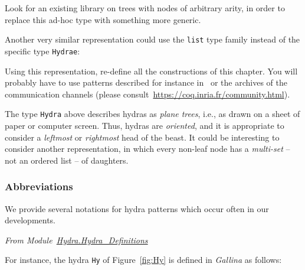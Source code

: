 



\begin{project}
Look for an existing library on trees with nodes of arbitrary arity, in order to replace  this ad-hoc type with something more generic.
\end{project}



\begin{project}

 Another very similar representation could use the \texttt{list} type family instead of the specific 
type \texttt{Hydrae}:




Using this representation, re-define all the constructions of this chapter.
You will probably have to use patterns described for instance in~\cite{BC04} or the archives of the \coq communication channels (please consult~\url{https://coq.inria.fr/community.html}).

  
\end{project}



\begin{project}
The type \texttt{Hydra} above describes hydras as \emph{plane trees}, i.e., as drawn on a sheet of paper or computer screen. Thus, hydras are \emph{oriented},
and it is appropriate to consider a \emph{leftmost} or \emph{rightmost} head of
the beast. It could be interesting to consider another representation, in which
every non-leaf node has a \emph{multi-set} -- not an ordered list -- of daughters.
\end{project}

\subsubsection{Abbreviations}

We provide several notations for hydra patterns  which occur often in our developments. 

\vspace{4pt}
\noindent
\emph{From Module~\href{../theories/html/hydras.Hydra.Hydra_Definitions.html\#head}{Hydra.Hydra\_Definitions}}




For instance, the hydra \texttt{Hy}  of Figure~\vref{fig:Hy} is defined in \emph{Gallina} as follows:

